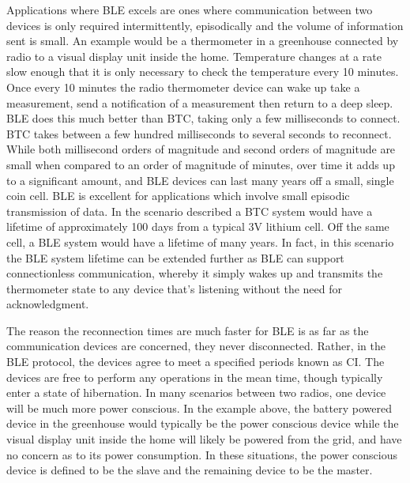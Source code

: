\documentclass[]{article}
\begin{document}
Applications where \ac{BLE} excels  are ones where communication between two devices is only required intermittently, episodically and the volume of information sent is small. An example would be a thermometer in a greenhouse connected by radio to a visual display unit inside the home. Temperature changes at a rate slow enough that it is only necessary to check the temperature every 10 minutes. Once every 10 minutes the radio thermometer device can wake up take a measurement, send a notification of a measurement then return to a deep sleep. \ac{BLE} does this much better than \ac{BTC}, taking only a few milliseconds to connect. \ac{BTC} takes between a few hundred milliseconds to several seconds to reconnect. While both millisecond orders of magnitude and second orders of magnitude are small when compared to an order of magnitude of minutes, over time it adds up to a significant amount, and \ac{BLE} devices can last many years off a small, single coin cell. \ac{BLE} is excellent for applications which involve small episodic transmission of data. In the scenario described a \ac{BTC} system would have a lifetime of approximately 100 days from a typical 3V lithium cell. Off the same cell, a \ac{BLE} system would have a lifetime of many years. In fact, in this scenario the \ac{BLE} system lifetime can be extended further as \ac{BLE} can support connectionless communication, whereby it simply wakes up and transmits the thermometer state to any device that's listening without the need for acknowledgment. 

The reason the reconnection times are much faster for \ac{BLE} is as far as the communication devices are concerned, they never disconnected. Rather, in the \ac{BLE} protocol, the devices agree to meet a specified periods known as \ac{CI}. The devices are free to perform any operations in the mean time, though typically enter a state of hibernation. In many scenarios between two radios, one device will be much more power conscious. In the example above, the battery powered device in the greenhouse would typically be the power conscious device while the visual display unit inside the home will likely be powered from the grid, and have no concern as to its power consumption. In these situations, the power conscious device is defined to be the slave and the remaining device to be the master. 
\end{document}
